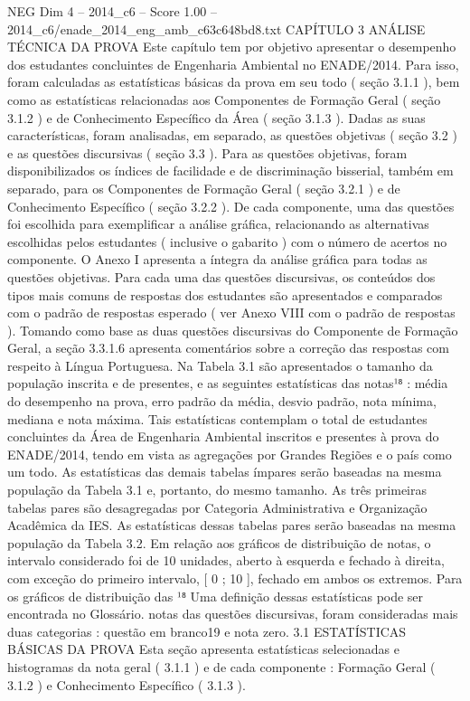 \begin{textsample}{NEG Dim 4 – 2014\_c6 – Score 1.00 – 2014\_c6/enade\_2014\_eng\_amb\_c63c648bd8.txt}  \label{ex:f4_neg_279}
CAPÍTULO 3 ANÁLISE TÉCNICA DA PROVA Este capítulo tem por objetivo apresentar o desempenho dos estudantes concluintes de Engenharia Ambiental no ENADE/2014.
Para isso, foram calculadas as estatísticas básicas da prova em seu todo ( seção 3.1.1 ), bem como as estatísticas relacionadas aos Componentes de Formação Geral ( seção 3.1.2 ) e de Conhecimento Específico da Área ( seção 3.1.3 ).
Dadas as suas características, foram analisadas, em separado, as questões objetivas ( seção 3.2 ) e as questões discursivas ( seção 3.3 ).
Para as questões objetivas, foram disponibilizados os índices de facilidade e de discriminação bisserial, também em separado, para os Componentes de Formação Geral ( seção 3.2.1 ) e de Conhecimento Específico ( seção 3.2.2 ).
De cada componente, uma das questões foi escolhida para exemplificar a análise gráfica, relacionando as alternativas escolhidas pelos estudantes ( inclusive o gabarito ) com o número de acertos no componente.
O Anexo I apresenta a íntegra da análise gráfica para todas as questões objetivas.
Para cada uma das questões discursivas, os conteúdos dos tipos mais comuns de respostas dos estudantes são apresentados e comparados com o padrão de respostas esperado ( ver Anexo VIII com o padrão de respostas ).
Tomando como base as duas questões discursivas do Componente de Formação Geral, a seção 3.3.1.6 apresenta comentários sobre a correção das respostas com respeito à Língua Portuguesa.
Na Tabela 3.1 são apresentados o tamanho da população inscrita e de presentes, e as seguintes estatísticas das notas¹⁸ : média do desempenho na prova, erro padrão da média, desvio padrão, nota mínima, mediana e nota máxima.
Tais estatísticas contemplam o total de estudantes concluintes da Área de Engenharia Ambiental inscritos e presentes à prova do ENADE/2014, tendo em vista as agregações por Grandes Regiões e o país como um todo.
As estatísticas das demais tabelas ímpares serão baseadas na mesma população da Tabela 3.1 e, portanto, do mesmo tamanho.
As três primeiras tabelas pares são desagregadas por Categoria Administrativa e Organização Acadêmica da IES.
As estatísticas dessas tabelas pares serão baseadas na mesma população da Tabela 3.2.
Em relação aos gráficos de distribuição de notas, o intervalo considerado foi de 10 unidades, aberto à esquerda e fechado à direita, com exceção do primeiro intervalo, [ 0 ; 10 ], fechado em ambos os extremos.
Para os gráficos de distribuição das ¹⁸ Uma definição dessas estatísticas pode ser encontrada no Glossário. notas das questões discursivas, foram consideradas mais duas categorias : questão em branco19 e nota zero. 3.1 ESTATÍSTICAS BÁSICAS DA PROVA Esta seção apresenta estatísticas selecionadas e histogramas da nota geral ( 3.1.1 ) e de cada componente : Formação Geral ( 3.1.2 ) e Conhecimento Específico ( 3.1.3 ).

\end{textsample}
